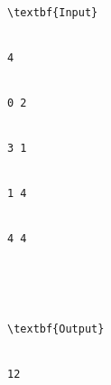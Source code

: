 \begin{verbatim}
\textbf{Input}


4 


0 2 


3 1 


1 4 


4 4 





\textbf{Output}


12\end{verbatim}